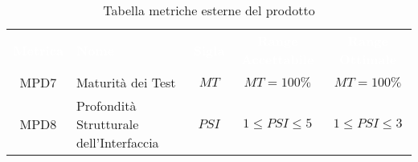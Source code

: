 \newpage %

\renewcommand{\arraystretch}{1.5}
\begin{longtable}{ c C{4cm} c c c}
\caption{Tabella metriche esterne del prodotto}\\
\textcolor{white}{\textbf{Metrica}} & \textcolor{white}{\textbf{Nome}} & \textcolor{white}{\textbf{Sigla}} & \textcolor{white}{\textbf{Range Accettabile}} & \textcolor{white}{\textbf{Range Ottimale}}\\
    MPD7 & Maturità dei Test & $MT$ & $MT = 100\%$ & $MT = 100\%$\\
    MPD8 & Profondità Strutturale dell'Interfaccia & $PSI$ & $1 \leq PSI \leq 5$ &$1 \leq PSI \leq 3$\\
\end{longtable}
